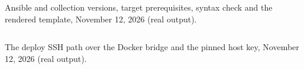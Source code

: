 \begin{longlisting}
\inputminted[fontsize=\scriptsize]{text}{evidence/174-ansible-versions-syntax-check-rendered-compose-sd-2026-11-12.txt}
\caption{Ansible and collection versions, target prerequisites, syntax check and the rendered template, November 12, 2026 (real output).}
\label{Listing:E174}
\end{longlisting}

\begin{longlisting}
\inputminted[fontsize=\scriptsize]{text}{evidence/175-deploy-ssh-path-from-agent-network-host-key-sd-2026-11-12.txt}
\caption{The deploy SSH path over the Docker bridge and the pinned host key, November 12, 2026 (real output).}
\label{Listing:E175}
\end{longlisting}

